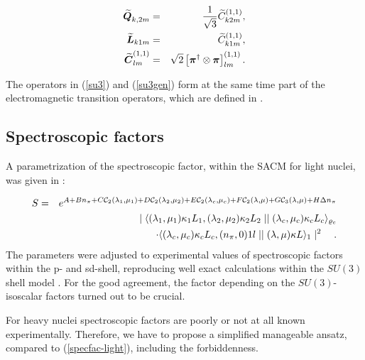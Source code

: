 \documentclass[12pt]{article}
\newcommand{\beqa}{\begin{eqnarray}}
\newcommand{\eeqa}{\end{eqnarray}}
\begin{document}
\begin{eqnarray}
\mbox{\boldmath $\widetilde{Q}$}_{k,2m} & = & \frac{1}{\sqrt{3}}
\widetilde{C}^{(1,1)}_{k2m} , \nonumber \\
\mbox{\boldmath $\widetilde{L}$}_{k1m} & = & \widetilde{C}^{(1,1)}_{k1m} , 
\nonumber \\
\mbox{\boldmath $\widetilde{C}$}^{(1,1)}_{lm} & = & \sqrt{2} \left[
\mbox{\boldmath
$\pi$}^\dagger \otimes \mbox{\boldmath $\pi$} \right]^{(1,1)}_{lm} .
\label{su3gen}
\end{eqnarray}

The operators in (\ref{su3}) and (\ref{su3gen}) 
form at the same time part of the electromagnetic transition
operators, which are defined in \cite{hess-86}.

\subsection{Spectroscopic factors}

A parametrization of the spectroscopic factor, within the SACM for light nuclei, was given in 
\cite{specfac-draayer}:

\beqa
S & = & e^{A + B n_\pi + C{\cal C}_2(\lambda_1,\mu_1) 
+ D{\cal C}_2(\lambda_2,\mu_2) 
+ E{\cal C}_2(\lambda_c,\mu_c)
+ F{\cal C}_2(\lambda , \mu ) + G{\cal C}_3(\lambda , \mu ) 
+ H\Delta n_\pi}
\nonumber \\
&&
\mid 
\langle (\lambda_1,\mu_1)\kappa_1L_1, 
(\lambda_2,\mu_2)\kappa_2L_2 \mid\mid
(\lambda_c,\mu_c)\kappa_cL_c \rangle_{\varrho_c}
\nonumber \\
&& \cdot
\langle (\lambda_c,\mu_c)\kappa_cL_c, 
(n_\pi ,0)1l \mid\mid
(\lambda ,\mu )\kappa L \rangle_1
\mid^2
~~~.
\label{specfac-light}
\eeqa
The parameters were adjusted to experimental values of 
spectroscopic factors within the p- and sd-shell,
reproducing well exact calculations within
the $SU(3)$ shell model \cite{draayer2}. For the good
agreement, the factor depending on the $SU(3)$-isoscalar factors turned out to be crucial.

For heavy nuclei spectroscopic factors are poorly or not at all known experimentally.
Therefore, we have to propose a simplified manageable ansatz, compared
to (\ref{specfac-light}), including the forbiddenness.
\end{document}

